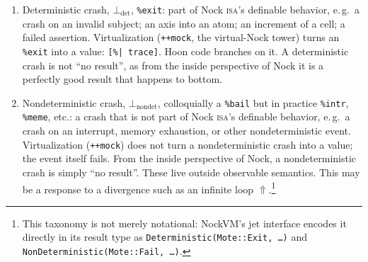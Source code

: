 \documentclass[twoside]{article}
\begin{document}
\begin{enumerate}
  \item  Deterministic crash, $\bot_\text{det}$, \lstinline[style=inlinecode]{%exit}:  part of Nock \textsc{isa}'s definable behavior, e.\,g.\ a crash on an invalid subject; an axis into an atom; an increment of a cell; a failed assertion.  Virtualization (\lstinline[style=inlinecode]{++mock}, the virtual-Nock tower) turns an \lstinline[style=inlinecode]{%exit} into a value: \lstinline[style=inlinecode]{[%| trace]}.  Hoon code branches on it.  A deterministic crash is not ``no result'', as from the inside perspective of Nock it is a perfectly good result that happens to bottom.
  \item  Nondeterministic crash, $\bot_\text{nondet}$, colloquially a \lstinline[style=inlinecode]{%bail} but in practice \lstinline[style=inlinecode]{%intr}, \lstinline[style=inlinecode]{%meme}, etc.:  a crash that is not part of Nock \textsc{isa}'s definable behavior, e.\,g.\ a crash on an interrupt, memory exhaustion, or other nondeterministic event.  Virtualization (\lstinline[style=inlinecode]{++mock}) does not turn a nondeterministic crash into a value; the event itself fails.  From the inside perspective of Nock, a nondeterministic crash is simply ``no result''.  These live outside observable semantics.  This may be a response to a divergence such as an infinite loop $\Uparrow$.\footnote{This taxonomy is not merely notational:  NockVM's jet interface encodes it directly in its result type as \texttt{Deterministic(Mote::Exit, …)} and \texttt{NonDeterministic(Mote::Fail, …)}.}
\end{enumerate}
\end{document}
